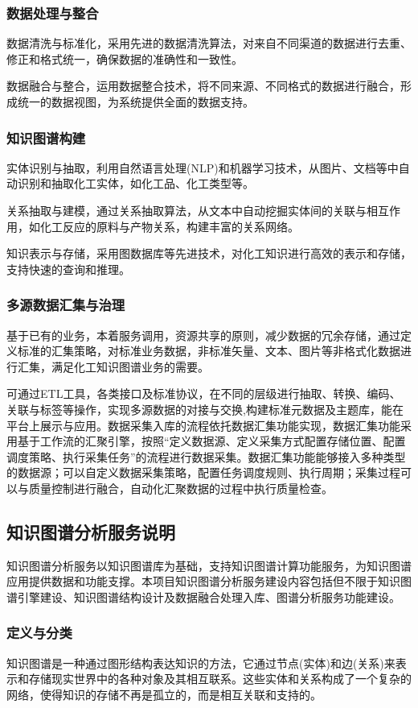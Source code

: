 \subsubsection{数据处理与整合} 
数据清洗与标准化，采用先进的数据清洗算法，对来自不同渠道的数据进行去重、修正和格式统一，确保数据的准确性和一致性。

数据融合与整合，运用数据整合技术，将不同来源、不同格式的数据进行融合，形成统一的数据视图，为系统提供全面的数据支持。

\subsubsection{知识图谱构建} 
实体识别与抽取，利用自然语言处理\textrm{(NLP)}和机器学习技术，从图片、文档等中自动识别和抽取化工实体，如化工品、化工类型等。

关系抽取与建模，通过关系抽取算法，从文本中自动挖掘实体间的关联与相互作用，如化工反应的原料与产物关系，构建丰富的关系网络。

知识表示与存储，采用图数据库等先进技术，对化工知识进行高效的表示和存储，支持快速的查询和推理。

\subsubsection{多源数据汇集与治理} 
基于已有的业务，本着服务调用，资源共享的原则，减少数据的冗余存储，通过定义标准的汇集策略，对标准业务数据，非标准矢量、文本、图片等非格式化数据进行汇集，满足化工知识图谱业务的需要。

可通过ETL工具，各类接口及标准协议，在不同的层级进行抽取、转换、编码、关联与标签等操作，实现多源数据的对接与交换,构建标准元数据及主题库，能在平台上展示与应用。数据采集入库的流程依托数据汇集功能实现，数据汇集功能采用基于工作流的汇聚引擎，按照``定义数据源、定义采集方式配置存储位置、配置调度策略、执行采集任务''的流程进行数据采集。数据汇集功能能够接入多种类型的数据源；可以自定义数据采集策略，配置任务调度规则、执行周期；采集过程可以与质量控制进行融合，自动化汇聚数据的过程中执行质量检查。

\subsection{知识图谱分析服务说明} 
知识图谱分析服务以知识图谱库为基础，支持知识图谱计算功能服务，为知识图谱应用提供数据和功能支撑。本项目知识图谱分析服务建设内容包括但不限于知识图谱引擎建设、知识图谱结构设计及数据融合处理入库、图谱分析服务功能建设。

\subsubsection{定义与分类} 
知识图谱是一种通过图形结构表达知识的方法，它通过节点(实体)和边(关系)来表示和存储现实世界中的各种对象及其相互联系。这些实体和关系构成了一个复杂的网络，使得知识的存储不再是孤立的，而是相互关联和支持的。

